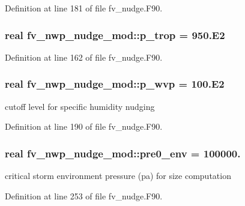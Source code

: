 Definition at line 181 of file fv\-\_\-nudge.\-F90.

\subsubsection[{p\-\_\-trop}]{\setlength{\rightskip}{0pt plus 5cm}real fv\-\_\-nwp\-\_\-nudge\-\_\-mod\-::p\-\_\-trop = 950.E2\hspace{0.3cm}{\ttfamily [private]}}\label{classfv__nwp__nudge__mod_aa5e41c5d5b93d1e265d8929674b87023}


Definition at line 162 of file fv\-\_\-nudge.\-F90.

\subsubsection[{p\-\_\-wvp}]{\setlength{\rightskip}{0pt plus 5cm}real fv\-\_\-nwp\-\_\-nudge\-\_\-mod\-::p\-\_\-wvp = 100.E2\hspace{0.3cm}{\ttfamily [private]}}\label{classfv__nwp__nudge__mod_a05315b1d11b770d5ea2eb43325d8fe83}


cutoff level for specific humidity nudging 



Definition at line 190 of file fv\-\_\-nudge.\-F90.

\subsubsection[{pre0\-\_\-env}]{\setlength{\rightskip}{0pt plus 5cm}real fv\-\_\-nwp\-\_\-nudge\-\_\-mod\-::pre0\-\_\-env = 100000.\hspace{0.3cm}{\ttfamily [private]}}\label{classfv__nwp__nudge__mod_a18ccc45a22e3d7fe4ebd33add4819161}


critical storm environment pressure (pa) for size computation 



Definition at line 253 of file fv\-\_\-nudge.\-F90.

